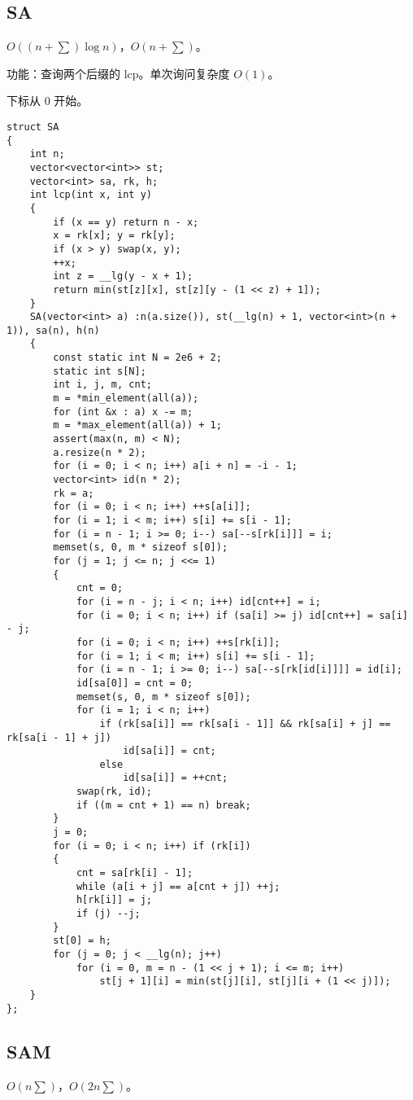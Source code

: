 \documentclass[12pt]{ctexart}
\begin{document}
\subsection{SA}

$O((n+\sum)\log n)$，$O(n+\sum)$。

功能：查询两个后缀的 lcp。单次询问复杂度 $O(1)$。

下标从 $0$ 开始。

\begin{lstlisting}
struct SA
{
	int n;
	vector<vector<int>> st;
	vector<int> sa, rk, h;
	int lcp(int x, int y)
	{
		if (x == y) return n - x;
		x = rk[x]; y = rk[y];
		if (x > y) swap(x, y);
		++x;
		int z = __lg(y - x + 1);
		return min(st[z][x], st[z][y - (1 << z) + 1]);
	}
	SA(vector<int> a) :n(a.size()), st(__lg(n) + 1, vector<int>(n + 1)), sa(n), h(n)
	{
		const static int N = 2e6 + 2;
		static int s[N];
		int i, j, m, cnt;
		m = *min_element(all(a));
		for (int &x : a) x -= m;
		m = *max_element(all(a)) + 1;
		assert(max(n, m) < N);
		a.resize(n * 2);
		for (i = 0; i < n; i++) a[i + n] = -i - 1;
		vector<int> id(n * 2);
		rk = a;
		for (i = 0; i < n; i++) ++s[a[i]];
		for (i = 1; i < m; i++) s[i] += s[i - 1];
		for (i = n - 1; i >= 0; i--) sa[--s[rk[i]]] = i;
		memset(s, 0, m * sizeof s[0]);
		for (j = 1; j <= n; j <<= 1)
		{
			cnt = 0;
			for (i = n - j; i < n; i++) id[cnt++] = i;
			for (i = 0; i < n; i++) if (sa[i] >= j) id[cnt++] = sa[i] - j;
			for (i = 0; i < n; i++) ++s[rk[i]];
			for (i = 1; i < m; i++) s[i] += s[i - 1];
			for (i = n - 1; i >= 0; i--) sa[--s[rk[id[i]]]] = id[i];
			id[sa[0]] = cnt = 0;
			memset(s, 0, m * sizeof s[0]);
			for (i = 1; i < n; i++)
				if (rk[sa[i]] == rk[sa[i - 1]] && rk[sa[i] + j] == rk[sa[i - 1] + j])
					id[sa[i]] = cnt;
				else
					id[sa[i]] = ++cnt;
			swap(rk, id);
			if ((m = cnt + 1) == n) break;
		}
		j = 0;
		for (i = 0; i < n; i++) if (rk[i])
		{
			cnt = sa[rk[i] - 1];
			while (a[i + j] == a[cnt + j]) ++j;
			h[rk[i]] = j;
			if (j) --j;
		}
		st[0] = h;
		for (j = 0; j < __lg(n); j++)
			for (i = 0, m = n - (1 << j + 1); i <= m; i++)
				st[j + 1][i] = min(st[j][i], st[j][i + (1 << j)]);
	}
};
\end{lstlisting}

\subsection{SAM}

$O(n\sum)$，$O(2n\sum )$。
\end{document}

